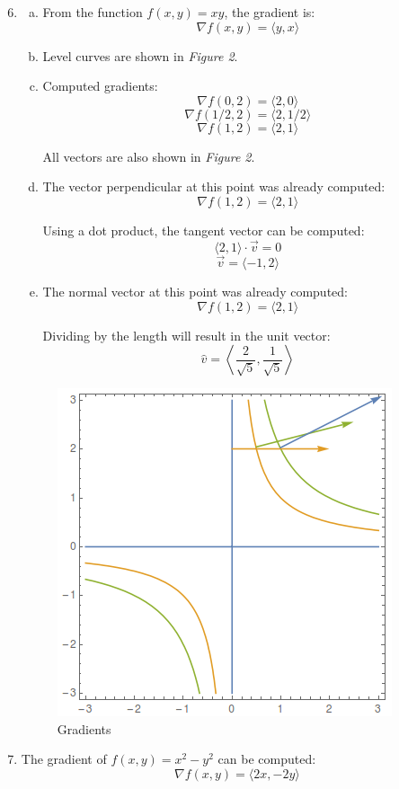 \documentclass{article}
\begin{document}
\begin{enumerate}[1.]
  \setcounter{enumi}{5}
  \item \begin{enumerate}[a.]
      \item From the function $f(x, y) = xy$, the gradient is:
        $$ \nabla f(x, y) = \langle y, x \rangle $$
      \item Level curves are shown in \textit{Figure 2}.
      \item Computed gradients:
        $$ \nabla f(0,2) = \langle 2, 0 \rangle $$
        $$ \nabla f(1/2, 2) = \langle 2, 1/2 \rangle $$
        $$ \nabla f(1, 2) = \langle 2, 1 \rangle$$

        All vectors are also shown in \textit{Figure 2}.
      \item The vector perpendicular at this point was already computed:
        $$ \nabla f(1, 2) = \langle 2, 1 \rangle $$

        Using a dot product, the tangent vector can be computed:
        $$ \langle 2, 1 \rangle \cdot \vec{v} = 0 $$
        $$ \vec{v} = \langle -1, 2 \rangle $$
      \item The normal vector at this point was already computed:
        $$ \nabla f(1, 2) = \langle 2, 1 \rangle $$

        Dividing by the length will result in the unit vector:
        $$ \hat{v} = \left\langle \frac{ 2 }{ \sqrt{5} }, \frac{ 1 }{ \sqrt{5} }
        \right\rangle $$
    \end{enumerate}

    \begin{figure}[H]
      \centering
      \includegraphics[scale=0.70]{"Gradient"}
      \caption{Gradients}
    \end{figure}
  \item The gradient of $f(x,y) = x^{2} - y^{2}$ can be computed:
    $$ \nabla f(x,y) = \langle 2x, -2y \rangle $$


\end{enumerate}
\end{document}
